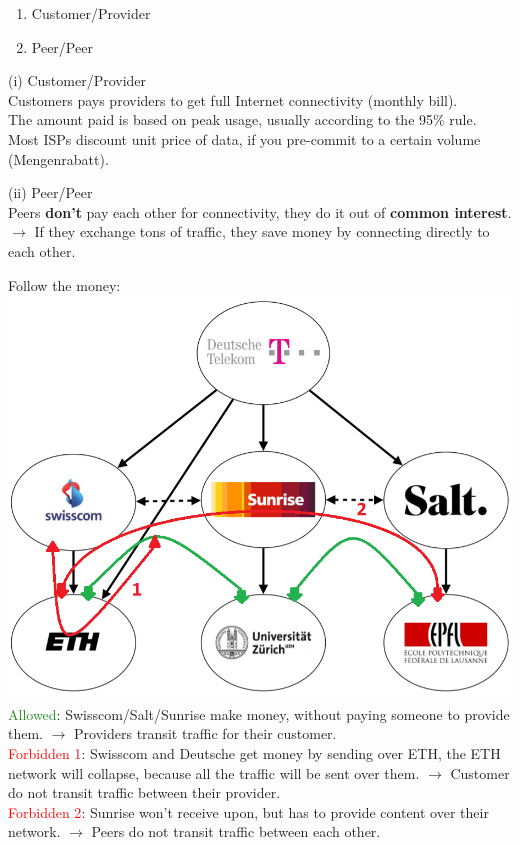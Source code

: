 \documentclass[a4paper, fontsize=8pt, landscape, DIV=1]{scrartcl}
\begin{document}
\begin{multicols*}{4}
		\begin{enumerate}[label=(\roman*),noitemsep]
			\item Customer/Provider
			\item Peer/Peer
		\end{enumerate}
		(i) Customer/Provider\\
		Customers pays providers to get full Internet connectivity (monthly bill).\\
		The amount paid is based on peak usage, usually according to the 95\% rule.\\
		Most ISPs discount unit price of data, if you pre-commit to a certain volume
		(Mengenrabatt).\par 
		
		(ii) Peer/Peer\\
		Peers \textbf{don't} pay each other for connectivity, they do it out of
		\textbf{common interest}. $\rightarrow$ If they exchange tons of traffic, they
		save money by connecting directly to each other.\par 
		
		Follow the money:\\ 
		
		\includegraphics[width=\columnwidth]{images/Network_Layer/follow_the_money.png}
		\textcolor{ForestGreen}{Allowed}: Swisscom/Salt/Sunrise make money, without
		paying someone to provide them. $\rightarrow$ Providers transit traffic for
		their customer.\\ 
		\textcolor{Red}{Forbidden 1}: Swisscom and Deutsche get money by sending over
		ETH, the ETH network will collapse, because all the traffic will be sent over
		them. $\rightarrow$ Customer do not transit traffic between their provider.\\
		\textcolor{Red}{Forbidden 2}: Sunrise won't receive upon, but has to provide
		content over their network. $\rightarrow$ Peers do not transit traffic between
		each other.\par 
		

\end{multicols*}
\end{document}
